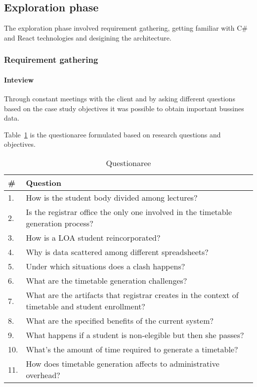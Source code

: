 \subsection{Exploration phase}
The exploration phase involved requirement gathering, getting familiar with C\# and React technologies and desigining the architecture.

\subsubsection{Requirement gathering}
\paragraph{Inteview} Through constant meetings with the client and by asking different questions based on the case study objectives it was possible to obtain important bussines data.

Table~\ref{tab:questionaree} is the questionaree formulated based on research questions and objectives.
\begin{table}[h]
    \caption{Questionaree}\label{tab:questionaree}
    \begin{tabularx}{\textwidth}{lX}
        \toprule
        \textbf{\#} &  \textbf{Question}\\
        \midrule
        1. & How is the student body divided among lectures? \\
        2. & Is the registrar office the only one involved in the timetable generation process?\\
        3. & How is a LOA student reincorporated?\\
        4. & Why is data scattered among different spreadsheets?\\
        5. & Under which situations does a clash happens?\\
        6. & What are the timetable generation challenges?\\
        7. & What are the artifacts that registrar creates in the context of timetable and student enrollment?\\
        8. & What are the specified benefits of the current system?\\
        9. & What happens if a student is non-elegible but then she passes?\\
        10. & What's the amount of time required to generate a timetable?\\
        11. & How does timetable generation affects to administrative overhead?\\
        \bottomrule
    \end{tabularx}
\end{table}

